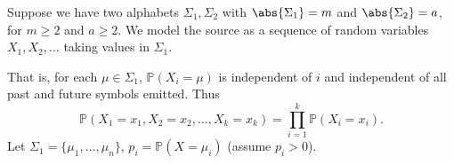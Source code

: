 \documentclass{article}
\newcommand{\Prob}{\mathbb{P}}
\newcommand{\1}[1]{\mathbbm{1}_{#1}}
\begin{document}
Suppose we have two alphabets $\Sigma_1, \Sigma_2$ with $\abs{\Sigma_1} = m$ and $\abs{\Sigma_2} = a$, for $m \geq 2$ and $a \geq 2$.
We model the source as a sequence of random variables $X_1, X_2, \dotsc$ taking values in $\Sigma_1$.
That is, for each $\mu \in \Sigma_1$, $\Prob(X_i = \mu)$ is independent of $i$ and independent of all past and future symbols emitted. Thus
\begin{equation*}
    \Prob(X_1= x_1, X_2 = x_2, \dotsc, X_k = x_k) = \prod_{i = 1}^k \Prob(X_i = x_i).
\end{equation*}
Let $\Sigma_1 = \{\mu_1, \dotsc, \mu_n\}$, $p_i = \Prob(X=\mu_i)$ (assume $p_i > 0$).
\end{document}
